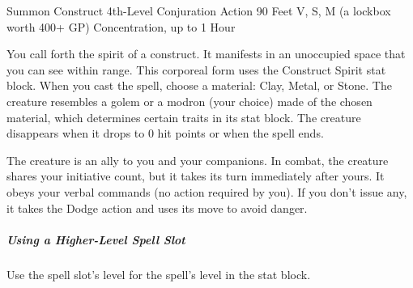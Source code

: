 \documentclass[letterpaper,openany,oneside,twocolumn]{book}
\begin{document}
\DndSpellHeader
  {Summon Construct}
  {4th-Level Conjuration}
  {Action}
  {90 Feet}
  {V, S, M (a lockbox worth 400+ GP)}
  {Concentration, up to 1 Hour}
  
You call forth the spirit of a construct. It manifests in an unoccupied space that you can see within range. This corporeal form uses the Construct Spirit stat block. When you cast the spell, choose a material: Clay, Metal, or Stone. The creature resembles a golem or a modron (your choice) made of the chosen material, which determines certain traits in its stat block. The creature disappears when it drops to 0 hit points or when the spell ends.

The creature is an ally to you and your companions. In combat, the creature shares your initiative count, but it takes its turn immediately after yours. It obeys your verbal commands (no action required by you). If you don't issue any, it takes the Dodge action and uses its move to avoid danger.

\subparagraph*{Using a Higher-Level Spell Slot} Use the spell slot's level for the spell's level in the stat block.
\end{document}
